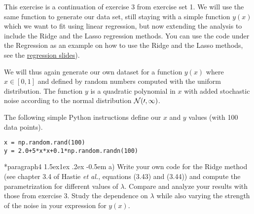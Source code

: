 \documentclass[%
oneside,                 %
final,                   %
10pt]{article}
\makeatletter
\newenvironment{doconceexercise}{}{}
\newcounter{doconceexercisecounter}
\newcommand\subex{\@startsection*{paragraph}{4}{\z@}%
                  {1.5ex\@plus1ex \@minus.2ex}%
                  {-0.5em}%
                  {\normalfont\normalsize\bfseries}}
\makeatother
\begin{document}
\begin{doconceexercise}

                             

This exercise is a continuation of exercise 3 from exercise set 1. We will
use the same function to generate our data set, still staying with a
simple function $y(x)$ which we want to fit using linear regression,
but now extending the analysis to include the Ridge and the Lasso
regression methods. You can use the code under the Regression as an example on how to use the Ridge and the Lasso methods, see the \href{{https://compphysics.github.io/MachineLearning/doc/pub/Regression/html/Regression-bs.html}}{regression slides}). 

We will thus again generate our own dataset for a function $y(x)$ where 
$x \in [0,1]$ and defined by random numbers computed with the uniform
distribution. The function $y$ is a quadratic polynomial in $x$ with
added stochastic noise according to the normal distribution $\cal{N}(0,1)$.

The following simple Python instructions define our $x$ and $y$ values (with 100 data points).



\begin{verbatim}
x = np.random.rand(100)
y = 2.0+5*x*x+0.1*np.random.randn(100)

\end{verbatim}


\subex{a)}
Write your own code for the Ridge method (see chapter 3.4 of Hastie \emph{et al.}, equations (3.43) and (3.44)) and compute the parametrization for different values of $\lambda$. Compare and analyze your results with those from exercise 3. Study the dependence on $\lambda$ while also varying the strength of the noise in your expression for $y(x)$.


\end{doconceexercise}
\end{document}
